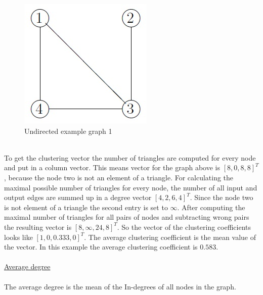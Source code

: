 \documentclass[12pt]{report}
\begin{document}
\begin{figure}[h]
\centering
\includegraphics[scale=.6]{graph}
\caption{Undirected example graph 1}
\label{FIG:abb49}
\end{figure}
\\
To get the clustering vector the number of triangles are computed for every node and put in a column vector. This means vector for the graph above is $ [8,0,8,8]^T $, because the node two is not an element of a triangle. For calculating the maximal possible number of triangles for every node, the number of all input and output edges are summed up in a degree vector $ [4,2,6,4]^T $. Since the node two is not element of a triangle the second entry is set to $ \infty $. After computing the maximal number of triangles for all pairs of nodes and subtracting wrong pairs the resulting vector is $ [8,\infty,24,8]^T $. So the vector of the clustering coefficients looks like $ [1,0,0.333,0]^T $. The average clustering coefficient is the mean value of the vector. In this example the average clustering coefficient is $ 0.583 $.\\
\\
\underline{Average degree}\\
\\
The average degree is the mean of the In-degrees of all nodes in the graph.\\
\end{document}
